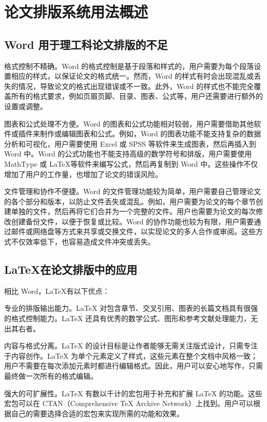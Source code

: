 \documentclass[UTF8]{ctexart}
\begin{document}
\section{论文排版系统用法概述}
\subsection{Word 用于理工科论文排版的不足}
    格式控制不精确。Word 的格式控制是基于段落和样式的，用户需要为每个段落设置相应的样式，以保证论文的格式统一。然而，Word 的样式有时会出现混乱或丢失的情况，导致论文的格式出现错误或不一致。此外，Word 的样式也不能完全覆盖所有的格式要求，例如页眉页脚、目录、图表、公式等，用户还需要进行额外的设置或调整。

    图表和公式处理不方便。Word 的图表和公式功能相对较弱，用户需要借助其他软件或插件来制作或编辑图表和公式。例如，Word 的图表功能不能支持复杂的数据分析和可视化，用户需要使用 Excel 或 SPSS 等软件来生成图表，然后再插入到 Word 中。Word 的公式功能也不能支持高级的数学符号和排版，用户需要使用 MathType 或 \LaTeX 等软件来编写公式，然后再复制到 Word 中。这些操作不仅增加了用户的工作量，也增加了论文的错误风险。

    文件管理和协作不便捷。Word 的文件管理功能较为简单，用户需要自己管理论文的各个部分和版本，以防止文件丢失或混乱。例如，用户需要为论文的每个章节创建单独的文件，然后再将它们合并为一个完整的文件。用户也需要为论文的每次修改创建备份文件，以便于恢复或比较。Word 的协作功能也较为有限，用户需要通过邮件或网络盘等方式来共享或交换文件，以实现论文的多人合作或审阅。这些方式不仅效率低下，也容易造成文件冲突或丢失。
\subsection{\LaTeX 在论文排版中的应用}

相比 Word，\LaTeX 有以下优点：

专业的排版输出能力。LaTeX 对包含章节、交叉引用、图表的长篇文档具有很强的格式控制能力。LaTeX 还具有优秀的数学公式、图形和参考文献处理能力，无出其右者。

内容与格式分离。LaTeX 的设计目标是让作者能够无需关注版式设计，只需专注于内容创作。LaTeX 为单个元素定义了样式，这些元素在整个文档中风格一致；用户不需要在每次添加元素时都进行编辑格式。因此，用户可以安心地写作，只需最终做一次所有的格式编辑。

强大的可扩展性。LaTeX 有数以千计的宏包用于补充和扩展 LaTeX 的功能。这些宏包可以在 CTAN（Comprehensive TeX Archive Network）上找到。用户可以根据自己的需要选择合适的宏包来实现所需的功能和效果。
\end{document}
